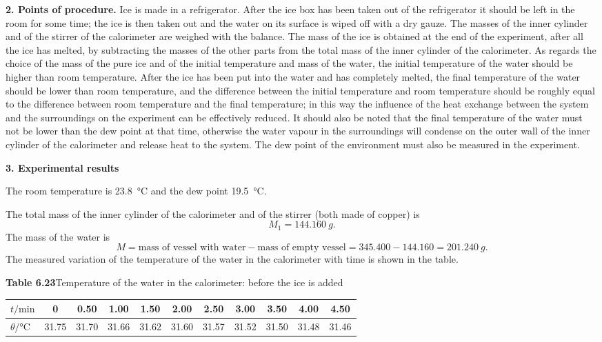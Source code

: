 \textbf{2. Points of procedure.} Ice is made in a refrigerator. After the ice box has been taken out of the refrigerator it should be left in the room for some time; the ice is then taken out and the water on its surface is wiped off with a dry gauze. The masses of the inner cylinder and of the stirrer of the calorimeter are weighed with the balance. The mass of the ice is obtained at the end of the experiment, after all the ice has melted, by subtracting the masses of the other parts from the total mass of the inner cylinder of the calorimeter. As regards the choice of the mass of the pure ice and of the initial temperature and mass of the water, the initial temperature of the water should be higher than room temperature. After the ice has been put into the water and has completely melted, the final temperature of the water should be lower than room temperature, and the difference between the initial temperature and room temperature should be roughly equal to the difference between room temperature and the final temperature; in this way the influence of the heat exchange between the system and the surroundings on the experiment can be effectively reduced. It should also be noted that the final temperature of the water must not be lower than the dew point at that time, otherwise the water vapour in the surroundings will condense on the outer wall of the inner cylinder of the calorimeter and release heat to the system. The dew point of the environment must also be measured in the experiment.

\textbf{3. Experimental results}

The room temperature is \SI{23.8}{\celsius} and the dew point \SI{19.5}{\celsius}.

The total mass of the inner cylinder of the calorimeter and of the stirrer (both made of copper) is
\begin{equation*}
M_1=\SI{144.160}{g}.
\end{equation*}
The mass of the water is
\begin{equation*}
M=\text{mass of vessel with water}-\text{mass of empty vessel}
=345.400-144.160=\SI{201.240}{g}.
\end{equation*}
The measured variation of the temperature of the water in the calorimeter with time is shown in the table.

\begin{center}
\textbf{Table 6.23}\quad Temperature of the water in the calorimeter: before the ice is added\\[3pt]
\small
\setlength{\tabcolsep}{3.2pt}
\begin{tabular}{lcccccccccc}
\toprule
$t/\mathrm{min}$ & 0 & 0.50 & 1.00 & 1.50 & 2.00 & 2.50 & 3.00 & 3.50 & 4.00 & 4.50\\
\midrule
$\theta/\si{\celsius}$ & 31.75 & 31.70 & 31.66 & 31.62 & 31.60 & 31.57 & 31.52 & 31.50 & 31.48 & 31.46\\
\bottomrule
\end{tabular}
\end{center}

